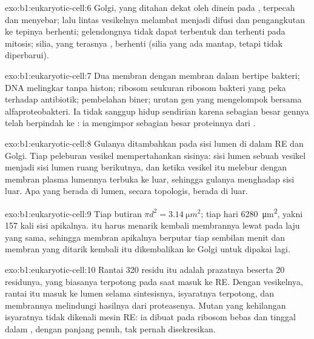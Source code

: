 \begin{solution}{exo:b1:eukaryotic-cell:6}
Golgi, yang ditahan dekat  oleh dinein pada ,
terpecah dan menyebar; lalu lintas vesikelnya melambat menjadi difusi
dan pengangkutan ke tepinya berhenti; gelendongnya tidak dapat
terbentuk dan  terhenti pada mitosis; silia, yang terasnya
, berhenti (silia yang ada mantap, tetapi tidak diperbarui).
\end{solution}

\begin{solution}{exo:b1:eukaryotic-cell:7}
Dua membran dengan membran dalam bertipe bakteri; DNA melingkar tanpa
histon; ribosom seukuran ribosom bakteri yang peka terhadap antibiotik;
pembelahan biner; urutan gen yang mengelompok bersama alfaproteobakteri.
Ia tidak sanggup hidup sendirian karena sebagian besar gennya telah
berpindah ke : ia mengimpor sebagian besar proteinnya dari .
\end{solution}

\begin{solution}{exo:b1:eukaryotic-cell:8}
Gulanya ditambahkan pada sisi lumen di dalam RE dan Golgi. Tiap
peleburan vesikel mempertahankan sisinya: sisi lumen sebuah vesikel
menjadi sisi lumen ruang berikutnya, dan ketika vesikel itu melebur
dengan membran plasma lumennya terbuka ke luar, sehingga gulanya
menghadap sisi luar. Apa yang berada di lumen, secara topologis, berada
di luar.
\end{solution}

\begin{solution}{exo:b1:eukaryotic-cell:9}
Tiap butiran $\pi d^2 = \qty{3.14}{\micro m^2}$; tiap hari
\qty{6280}{\micro m^2}, yakni \qty{157}{} kali sisi apikalnya.  itu
harus menarik kembali membrannya lewat  pada laju yang sama,
sehingga membran apikalnya berputar tiap sembilan menit dan membran
yang ditarik kembali itu dikembalikan ke Golgi untuk dipakai lagi.
\end{solution}

\begin{solution}{exo:b1:eukaryotic-cell:10}
Rantai \qty{320}{} residu itu adalah prazatnya beserta 
\qty{20}{} residunya, yang biasanya terpotong pada saat masuk ke RE.
Dengan vesikelnya, rantai itu masuk ke lumen selama sintesisnya,
isyaratnya terpotong, dan membrannya melindungi hasilnya dari
proteasenya. Mutan yang kehilangan isyaratnya tidak dikenali mesin RE:
ia dibuat pada ribosom bebas dan tinggal dalam , dengan panjang
penuh, tak pernah disekresikan.
\end{solution}

